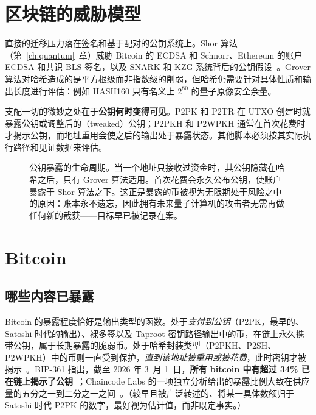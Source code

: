 \section{区块链的威胁模型}
直接的迁移压力落在签名和基于配对的公钥系统上。Shor 算法（第~\ref{ch:quantum}~章）威胁 Bitcoin 的 ECDSA 和 Schnorr、Ethereum 的账户 ECDSA 和共识 BLS 签名，以及 SNARK 和 KZG 系统背后的公钥假设~\cite{quantumhorizon2026,ethpqroadmap}。Grover 算法对哈希造成的是平方根级而非指数级的削弱，但哈希仍需要针对具体性质和输出长度进行评估：例如 HASH160 只有名义上 $2^{80}$ 的量子原像安全余量。

支配一切的微妙之处在于\textbf{公钥何时变得可见}。P2PK 和 P2TR 在 UTXO 创建时就暴露公钥或调整后的（tweaked）公钥；P2PKH 和 P2WPKH 通常在首次花费时才揭示公钥，而地址重用会使之后的输出处于暴露状态。其他脚本必须按其实际执行路径和见证数据来评估。

\begin{figure}[H]
\centering
{}
\caption{公钥暴露的生命周期。当一个地址只接收过资金时，其公钥隐藏在哈希之后，只有 Grover 算法适用。首次花费会永久公布公钥，使账户暴露于 Shor 算法之下。这正是暴露的币被视为无限期处于风险之中的原因：账本永不遗忘，因此拥有未来量子计算机的攻击者无需再做任何新的截获——目标早已被记录在案。}
\label{fig:pubkey-exposure}
\end{figure}

\section{Bitcoin}
\subsection{哪些内容已暴露}
Bitcoin 的暴露程度恰好是输出类型的函数。处于\emph{支付到公钥}（P2PK，最早的、Satoshi 时代的输出）、裸多签以及 Taproot 密钥路径输出中的币，在链上永久携带公钥，属于长期暴露的脆弱币。处于哈希封装类型（P2PKH、P2SH、P2WPKH）中的币则一直受到保护，\emph{直到该地址被重用或被花费}，此时密钥才被揭示~\cite{bip360,chaincodepq2025}。BIP-361 指出，截至 2026 年 3~月 1~日，\textbf{所有 bitcoin 中有超过 34\% 已在链上揭示了公钥}~\cite{bip361}；Chaincode Labs 的一项独立分析给出的暴露比例大致在供应量的五分之一到二分之一之间~\cite{chaincodepq2025}。（较早且被广泛转述的、将某一具体数额归于 Satoshi 时代 P2PK 的数字，最好视为估计值，而非既定事实。）


